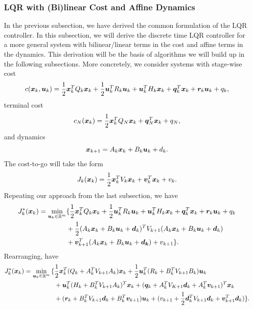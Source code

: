 \subsubsection{LQR with (Bi)linear Cost and Affine Dynamics}

In the previous subsection, we have derived the common formulation of the LQR controller. In this subsection, we will derive the discrete time LQR controller for a more general system with bilinear/linear terms in the cost and affine terms in the dynamics. This derivation will be the basis of algorithms we will build up in the following subsections. More concretely, we consider systems with stage-wise cost
\begin{equation}
    c(\bm{x}_k, \bm{u}_k) = \frac{1}{2} \bm{x}_k^T Q_k \bm{x}_k + \frac{1}{2} \bm{u}_k^T R_k \bm{u}_k + \bm{u}_k^T H_k \bm{x}_k +\bm{q}_k^T \bm{x}_k + \bm{r}_k \bm{u}_k + q_k,
\end{equation}
terminal cost
\begin{equation}
    c_N(\bm{x}_k) = \frac{1}{2} \bm{x}_k^T Q_N \bm{x}_k + \bm{q}_N^T \bm{x}_k + q_N,
\end{equation}
and dynamics
\begin{equation}
    \bm{x}_{k+1} = A_k \bm{x}_k + B_k \bm{u}_k + d_k.
\end{equation}
The cost-to-go will take the form 
\begin{equation}
    J_k(\bm{x}_k) = \frac{1}{2}\bm{x}_k^T V_k \bm{x}_k + \bm{v}_k^T \bm{x}_k + v_k.
\end{equation} 
Repeating our approach from the last subsection, we have
\begin{align}
\label{eq:LQR_rec_cost}
    J_{k}^*(\bm{x}_{k}) =  \min_{\bm{u}_{k} \in \mathbb{R}^m} & {\large\{} 
    \frac{1}{2} \bm{x}_{k}^T Q_{k} \bm{x}_{k} + \frac{1}{2} \bm{u}_{k}^T R_{k} \bm{u}_{k} + \bm{u}_k^T H_k \bm{x}_k +\bm{q}_k^T \bm{x}_k + \bm{r}_k \bm{u}_k + q_k \\
    &+ \frac{1}{2} (A_{k} \bm{x}_{k} + B_{k} \bm{u}_{k} + \bm{d}_k)^T V_{k+1} (A_{k} \bm{x}_{k} + B_{k} \bm{u}_{k} + \bm{d}_k) \nonumber \\
    & + \bm{v}^T_{k+1} (A_{k} \bm{x}_{k} + B_{k} \bm{u}_{k} + \bm{d_k}) + v_{k+1} {\large\}}. \nonumber
\end{align}
Rearranging, have
\begin{align}
    J_{k}^*(\bm{x}_{k}) = \min_{\bm{u}_{k} \in \mathbb{R}^m} {\Large\{}  
    & \frac{1}{2} \bm{x}_k^T (Q_k + A_k^T V_{k+1} A_k) \bm{x}_k + \frac{1}{2} \bm{u}_k^T (R_k + B_k^T V_{k+1} B_k) \bm{u}_k\\
    & + \bm{u}_k^T (H_k + B_k^T V_{k+1} A_k)^T \bm{x}_k + (\bm{q}_k + A_k^T V_{K+1} \bm{d}_k + A_k^T \bm{v}_{k+1})^T \bm{x}_k \nonumber \\
    & + (\bm{r}_k + B_k^T V_{k+1} \bm{d}_k + B_k^T \bm{v}_{k+1}) \bm{u}_k + (v_{k+1} + \frac{1}{2} \bm{d}_k^T V_{k+1} \bm{d}_k + \bm{v}_{k+1}^T \bm{d}_k) \nonumber
    {\Large\}}.
\end{align}
